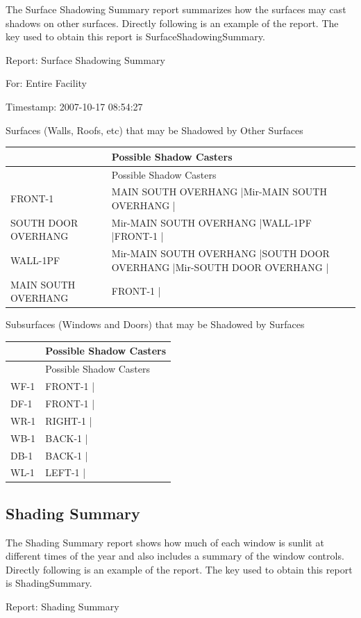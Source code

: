 The Surface Shadowing Summary report summarizes how the surfaces may cast shadows on other surfaces. Directly following is an example of the report. The key used to obtain this report is SurfaceShadowingSummary.

Report: Surface Shadowing Summary

For: Entire Facility

Timestamp: 2007-10-17 08:54:27

Surfaces (Walls, Roofs, etc) that may be Shadowed by Other Surfaces

\begin{longtable}[c]{>{\raggedright}p{1.5in}>{\raggedright}p{4.5in}}
\toprule
~ & Possible Shadow Casters \tabularnewline
\midrule
\endfirsthead

\toprule
~ & Possible Shadow Casters \tabularnewline
\midrule
\endhead

FRONT-1 & MAIN SOUTH OVERHANG |Mir-MAIN SOUTH OVERHANG | \tabularnewline
SOUTH DOOR OVERHANG & Mir-MAIN SOUTH OVERHANG |WALL-1PF |FRONT-1 | \tabularnewline
WALL-1PF & Mir-MAIN SOUTH OVERHANG |SOUTH DOOR OVERHANG |Mir-SOUTH DOOR OVERHANG | \tabularnewline
MAIN SOUTH OVERHANG & FRONT-1 | \tabularnewline
\bottomrule
\end{longtable}

Subsurfaces (Windows and Doors) that may be Shadowed by Surfaces

\begin{longtable}[c]{@{}ll@{}}
\toprule
~ & Possible Shadow Casters \tabularnewline
\midrule
\endfirsthead

\toprule
~ & Possible Shadow Casters \tabularnewline
\midrule
\endhead

WF-1 & FRONT-1 | \tabularnewline
DF-1 & FRONT-1 | \tabularnewline
WR-1 & RIGHT-1 | \tabularnewline
WB-1 & BACK-1 | \tabularnewline
DB-1 & BACK-1 | \tabularnewline
WL-1 & LEFT-1 | \tabularnewline
\bottomrule
\end{longtable}

\subsection{Shading Summary}\label{shading-summary-000}

The Shading Summary report shows how much of each window is sunlit at different times of the year and also includes a summary of the window controls. Directly following is an example of the report. The key used to obtain this report is ShadingSummary.

Report: Shading Summary

